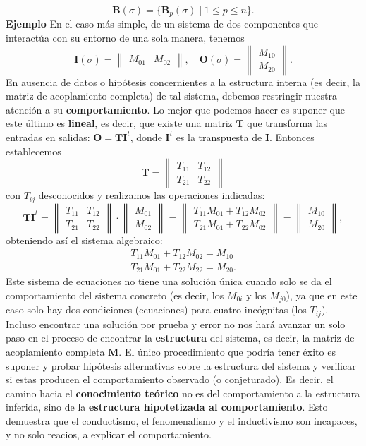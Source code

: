 {\fontsize{13}{15}\selectfont
$$ \mathbf{B}(\sigma) = \{\mathbf{B}_p(\sigma) \mid 1 \le p \le n \}. $$
\textbf{Ejemplo} En el caso más simple, de un sistema de dos componentes que interactúa con su entorno de una sola manera, tenemos
$$ \mathbf{I}(\sigma) = \begin{Vmatrix} M_{01} & M_{02} \end{Vmatrix}, \quad \mathbf{O}(\sigma) = \begin{Vmatrix} M_{10} \\ M_{20} \end{Vmatrix}. $$
En ausencia de datos o hipótesis concernientes a la estructura interna (es decir, la matriz de acoplamiento completa) de tal sistema, debemos restringir nuestra atención a su \textbf{comportamiento}. Lo mejor que podemos hacer es suponer que este último es \textbf{lineal}, es decir, que existe una matriz $\mathbf{T}$ que transforma las entradas en salidas: $\mathbf{O} = \mathbf{T} \mathbf{I}^t$, donde $\mathbf{I}^t$ es la transpuesta de $\mathbf{I}$. Entonces establecemos
$$ \mathbf{T} = \begin{Vmatrix} T_{11} & T_{12} \\ T_{21} & T_{22} \end{Vmatrix} $$
con $T_{ij}$ desconocidos y realizamos las operaciones indicadas:
$$ \mathbf{T} \mathbf{I}^t = \begin{Vmatrix} T_{11} & T_{12} \\ T_{21} & T_{22} \end{Vmatrix} \cdot \begin{Vmatrix} M_{01} \\ M_{02} \end{Vmatrix} = \begin{Vmatrix} T_{11}M_{01} + T_{12}M_{02} \\ T_{21}M_{01} + T_{22}M_{02} \end{Vmatrix} = \begin{Vmatrix} M_{10} \\ M_{20} \end{Vmatrix}, $$
obteniendo así el sistema algebraico:
\begin{gather*}
T_{11}M_{01} + T_{12}M_{02} = M_{10} \\
T_{21}M_{01} + T_{22}M_{22} = M_{20} .
\end{gather*}
Este sistema de ecuaciones no tiene una solución única cuando solo se da el comportamiento del sistema concreto (es decir, los $M_{0i}$ y los $M_{j0}$), ya que en este caso solo hay dos condiciones (ecuaciones) para cuatro incógnitas (los $T_{ij}$). Incluso encontrar una solución por prueba y error no nos hará avanzar un solo paso en el proceso de encontrar la \textbf{estructura} del sistema, es decir, la matriz de acoplamiento completa $\mathbf{M}$. El único procedimiento que podría tener éxito es suponer y probar hipótesis alternativas sobre la estructura del sistema y verificar si estas producen el comportamiento observado (o conjeturado). Es decir, el camino hacia el \textbf{conocimiento teórico} no es del comportamiento a la estructura inferida, sino de la \textbf{estructura hipotetizada al comportamiento}. Esto demuestra que el conductismo, el fenomenalismo y el inductivismo son incapaces, y no solo reacios, a explicar el comportamiento.
}
